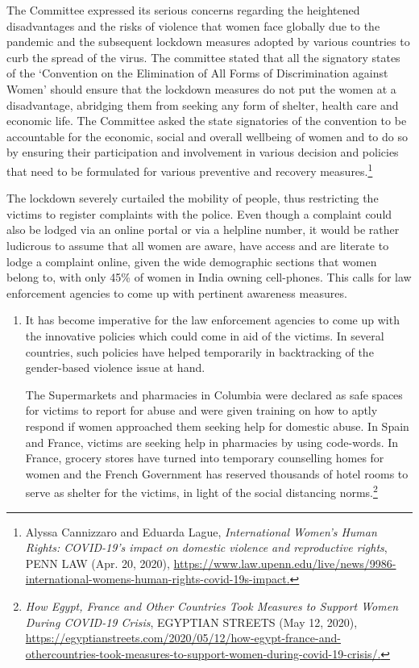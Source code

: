 \begin{multicols}{2}

\noi
The Committee expressed its serious concerns regarding the heightened disadvantages and
the risks of violence that women face globally due to the pandemic and the subsequent
lockdown measures adopted by various countries to curb the spread of the virus. The
committee stated that all the signatory states of the ‘Convention on the Elimination of All
Forms of Discrimination against Women’ should ensure that the lockdown measures do not
put the women at a disadvantage, abridging them from seeking any form of shelter, health
care and economic life. The Committee asked the state signatories of the convention to be
accountable for the economic, social and overall wellbeing of women and to do so by
ensuring their participation and involvement in various decision and policies that need to be
formulated for various preventive and recovery measures.\footnote{Alyssa Cannizzaro and Eduarda Lague, \textit{International Women’s Human Rights: COVID-19’s impact on
domestic violence and reproductive rights}, PENN LAW (Apr. 20, 2020),
\url{https://www.law.upenn.edu/live/news/9986-international-womens-human-rights-covid-19s-impact.}}


\noi
The lockdown severely curtailed the mobility of people, thus restricting the victims to register
complaints with the police. Even though a complaint could also be lodged via an online portal
or via a helpline number, it would be rather ludicrous to assume that all women are aware,
have access and are literate to lodge a complaint online, given the wide demographic sections
that women belong to, with only 45\% of women in India owning cell-phones. This calls for
law enforcement agencies to come up with pertinent awareness measures.


\begin{enumerate}
\itemsep=0pt
\item It has become imperative for the law enforcement agencies to come up with the
innovative policies which could come in aid of the victims. In several countries, such
policies have helped temporarily in backtracking of the gender-based violence issue at
hand.

The Supermarkets and pharmacies in Columbia were declared as safe spaces for
victims to report for abuse and were given training on how to aptly respond if women
approached them seeking help for domestic abuse. In Spain and France, victims are
seeking help in pharmacies by using code-words. In France, grocery stores have turned into temporary counselling homes for women and the French Government has
reserved thousands of hotel rooms to serve as shelter for the victims, in light of the
social distancing norms.\footnote{\textit{How Egypt, France and Other Countries Took Measures to Support Women During COVID-19 Crisis},
EGYPTIAN STREETS (May 12, 2020), \url{https://egyptianstreets.com/2020/05/12/how-egypt-france-and-othercountries-took-measures-to-support-women-during-covid-19-crisis/.}}


\end{enumerate}
\end{multicols}
